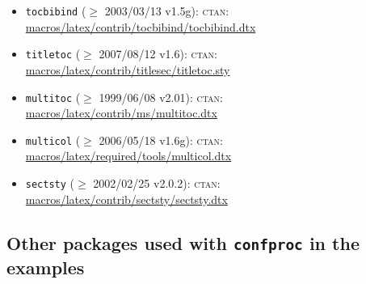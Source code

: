 \documentclass{article}
\newcommand{\ctan}{\textsc{ctan}}
\newcommand{\filename}{confproc}
\newcommand{\package}[1]{\texttt{#1}}
\begin{document}
\begin{itemize}
  \item \package{tocbibind}
             ($\ge$ 2003/03/13 v1.5g): 
    \ctan:  \href{http://www.ctan.org/tex-archive/macros/latex/contrib/tocbibind/tocbibind.dtx}{macros/latex/contrib/tocbibind/tocbibind.dtx}
  \item \package{titletoc}
             ($\ge$ 2007/08/12 v1.6): 
    \ctan:  \href{http://www.ctan.org/tex-archive/macros/latex/contrib/titlesec/titletoc.sty}{macros/latex/contrib/titlesec/titletoc.sty}
  \item \package{multitoc}
             ($\ge$ 1999/06/08 v2.01): 
    \ctan:  \href{http://www.ctan.org/tex-archive/macros/latex/contrib/ms/multitoc.dtx}{macros/latex/contrib/ms/multitoc.dtx}
  \item \package{multicol}
             ($\ge$ 2006/05/18 v1.6g): 
    \ctan:  \href{http://www.ctan.org/tex-archive/macros/latex/required/tools/multicol.dtx}{macros/latex/required/tools/multicol.dtx}
  \item \package{sectsty}
             ($\ge$ 2002/02/25 v2.0.2): 
    \ctan:  \href{http://www.ctan.org/tex-archive/macros/latex/contrib/sectsty/sectsty.dtx}{macros/latex/contrib/sectsty/sectsty.dtx}
\end{itemize}

\subsection{Other packages used with \package{\filename} in the examples}
\end{document}
